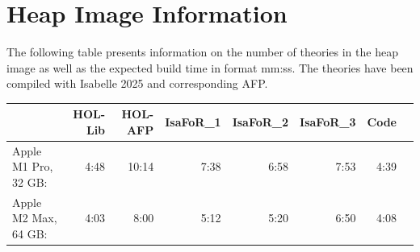 \documentclass{article}
\begin{document}
\section*{Heap Image Information}
The following table presents information on the number of theories in the heap image
as well as the expected build time in format mm:ss.
The theories have been compiled %
with Isabelle 2025 and corresponding AFP.

\begin{center}
\begin{tabular}{lrrrrrrr}
\toprule
               & HOL-Lib  & HOL-AFP & IsaFoR\_1 & IsaFoR\_2 & IsaFoR\_3 & Code\\
\midrule
Apple M1 Pro, 32 GB: 
               & 4:48     & 10:14    & 7:38      & 6:58      & 7:53      & 4:39 \\
Apple M2 Max, 64 GB:
               & 4:03     &  8:00    & 5:12      & 5:20      & 6:50      & 4:08 \\               
\bottomrule
\end{tabular}
\end{center}
\end{document}
